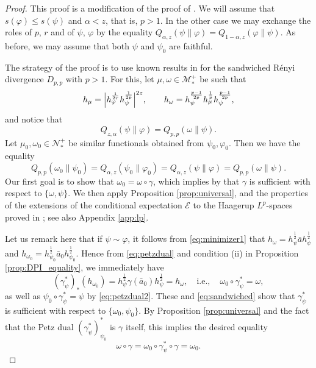 \documentclass[12pt]{article}
\theoremstyle{definition}
\theoremstyle{remark}
\numberwithin{equation}{section}
\def\cE{\mathcal E}
\def\Me{\mathcal M}
\def\Ne{\mathcal N}
\def\ffi{\varphi}
\begin{document}
\begin{proof} This proof is a modification of the proof of \cite[Theorem
5.1]{jencova2021renyi}.  
We will assume that $s(\ffi)\le s(\psi)$ and $\alpha<z$, that is, $p>1$. In the other case we may
exchange the roles of $p$, $r$ and of $\psi$, $\ffi$ by the equality
$Q_{\alpha,z}(\psi\|\varphi)=Q_{1-\alpha,z}(\varphi\|\psi)$. As before, we may assume that
both $\psi$ and $\psi_0$ are faithful.

The strategy of the proof is to use known results in \cite{jencova2018renyi} for the sandwiched
R\'enyi divergence $D_{p,p}$ with $p>1$. For this, let $\mu,\omega\in\Me_*^+$ be such that
\[
h_{\mu}=\Big|h_{\ffi}^{1\over 2r}h_{\psi}^{1\over 2p}\Big|^{2z},\qquad
h_\omega=h_\psi^{p-1\over 2p}h_\mu^{\frac1p}h_\psi^{p-1\over 2p},
\]
and notice that
\[
Q_{z,\alpha}(\psi\|\ffi)=Q_{p,p}(\omega\|\psi).
\]
Let $\mu_0,\omega_0\in \Ne_*^+$ be similar functionals obtained from $\psi_0,\ffi_0$. Then
we have the equality
\begin{equation}\label{eq:sandwiched}
Q_{p,p}(\omega_0\|\psi_0)=Q_{\alpha,z}(\psi_0\|\ffi_0)=Q_{\alpha,z}(\psi\|\ffi)=Q_{p,p}(\omega\|\psi).
\end{equation}
Our first goal is to show that $\omega_0=\omega\circ\gamma$, which implies by
\cite[Theorem 4.6]{jencova2018renyi} that $\gamma$ is sufficient with respect to $\{\omega,\psi\}$. 
 We then apply Proposition \ref{prop:universal},  and the properties of the extensions of the
conditional expectation $\cE$ to the Haagerup $L^p$-spaces proved in
\cite{junge2003noncommutative}; see also Appendix \ref{app:lp}.

Let us remark here that if $\psi\sim \ffi$, it follows from \eqref{eq:minimizer1} that
$h_\omega=h_\psi^{\frac12}\bar ah_\psi^{\frac12}$ and
$h_{\omega_0}=h_{\psi_0}^{\frac12}\bar a_0h_{\psi_0}^{\frac12}$. Hence from \eqref{eq:petzdual}
and condition (ii) in Proposition \ref{prop:DPI_equality}, we immediately have
\[
(\gamma^*_{\psi})_*(h_{\omega_0})=h_\psi^{\frac12}\gamma(\bar
a_0)h_\psi^{\frac12}=h_\omega,\quad
{\mbox{i.e.},\quad\omega_0\circ\gamma_\psi^*=\omega,}
\]
as well as $\psi_0\circ\gamma_\psi^*=\psi$ by \eqref{eq:petzdual2}.
These and \eqref{eq:sandwiched} show that $\gamma^*_\psi$ is sufficient with respect to
$\{\omega_0,\psi_0\}$. By Proposition \ref{prop:universal} and the fact that the
Petz dual  $(\gamma_\psi^*)_{\psi_0}^*$ is $\gamma$ itself, this implies the desired
equality
\[
\omega\circ\gamma= \omega_0\circ \gamma_\psi^*\circ\gamma=\omega_0.
\]


\end{proof}
\end{document}
